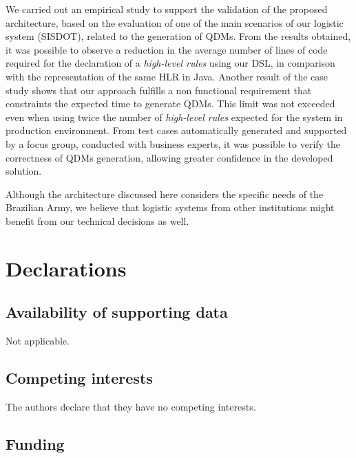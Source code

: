 \documentclass[AMA,STIX1COL]{WileyNJD-v2}
\newcommand{\callers}{\emph{high-level rules}\xspace}
\newcommand{\shc}{HLR\xspace}
\begin{document}
We carried out an empirical study to support the validation of the proposed architecture, based on the evaluation of one of the main scenarios of our logistic system (SISDOT), related to the generation of QDMs. From the results obtained, it was possible to observe a reduction in the average number of lines of code required for the declaration of a \callers using our DSL, in comparison with the representation of the same \shc in Java. Another result of the case study shows that our approach fulfills a non functional requirement that constraints the expected time to generate QDMs. This limit was not exceeded even when using twice the number of \callers expected for the system in production environment. From test cases automatically generated and supported by a focus group, conducted with business experts, it was possible to verify the correctness of QDMs generation, allowing greater confidence in the developed solution.

Although the architecture discussed here considers the specific needs of the Brazilian Army, we believe that logistic systems from other institutions might benefit from our technical decisions as well.







\section{Declarations}

\subsection{Availability of supporting data}

Not applicable.

\subsection{Competing interests}

The authors declare that they have no competing interests.

\subsection{Funding}
\end{document}
